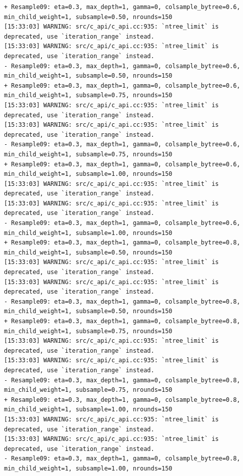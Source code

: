 \documentclass[
  letterpaper,
  DIV=11,
  numbers=noendperiod]{scrartcl}
\begin{document}
\begin{verbatim}
+ Resample09: eta=0.3, max_depth=1, gamma=0, colsample_bytree=0.6, min_child_weight=1, subsample=0.50, nrounds=150 
[15:33:03] WARNING: src/c_api/c_api.cc:935: `ntree_limit` is deprecated, use `iteration_range` instead.
[15:33:03] WARNING: src/c_api/c_api.cc:935: `ntree_limit` is deprecated, use `iteration_range` instead.
- Resample09: eta=0.3, max_depth=1, gamma=0, colsample_bytree=0.6, min_child_weight=1, subsample=0.50, nrounds=150 
+ Resample09: eta=0.3, max_depth=1, gamma=0, colsample_bytree=0.6, min_child_weight=1, subsample=0.75, nrounds=150 
[15:33:03] WARNING: src/c_api/c_api.cc:935: `ntree_limit` is deprecated, use `iteration_range` instead.
[15:33:03] WARNING: src/c_api/c_api.cc:935: `ntree_limit` is deprecated, use `iteration_range` instead.
- Resample09: eta=0.3, max_depth=1, gamma=0, colsample_bytree=0.6, min_child_weight=1, subsample=0.75, nrounds=150 
+ Resample09: eta=0.3, max_depth=1, gamma=0, colsample_bytree=0.6, min_child_weight=1, subsample=1.00, nrounds=150 
[15:33:03] WARNING: src/c_api/c_api.cc:935: `ntree_limit` is deprecated, use `iteration_range` instead.
[15:33:03] WARNING: src/c_api/c_api.cc:935: `ntree_limit` is deprecated, use `iteration_range` instead.
- Resample09: eta=0.3, max_depth=1, gamma=0, colsample_bytree=0.6, min_child_weight=1, subsample=1.00, nrounds=150 
+ Resample09: eta=0.3, max_depth=1, gamma=0, colsample_bytree=0.8, min_child_weight=1, subsample=0.50, nrounds=150 
[15:33:03] WARNING: src/c_api/c_api.cc:935: `ntree_limit` is deprecated, use `iteration_range` instead.
[15:33:03] WARNING: src/c_api/c_api.cc:935: `ntree_limit` is deprecated, use `iteration_range` instead.
- Resample09: eta=0.3, max_depth=1, gamma=0, colsample_bytree=0.8, min_child_weight=1, subsample=0.50, nrounds=150 
+ Resample09: eta=0.3, max_depth=1, gamma=0, colsample_bytree=0.8, min_child_weight=1, subsample=0.75, nrounds=150 
[15:33:03] WARNING: src/c_api/c_api.cc:935: `ntree_limit` is deprecated, use `iteration_range` instead.
[15:33:03] WARNING: src/c_api/c_api.cc:935: `ntree_limit` is deprecated, use `iteration_range` instead.
- Resample09: eta=0.3, max_depth=1, gamma=0, colsample_bytree=0.8, min_child_weight=1, subsample=0.75, nrounds=150 
+ Resample09: eta=0.3, max_depth=1, gamma=0, colsample_bytree=0.8, min_child_weight=1, subsample=1.00, nrounds=150 
[15:33:03] WARNING: src/c_api/c_api.cc:935: `ntree_limit` is deprecated, use `iteration_range` instead.
[15:33:03] WARNING: src/c_api/c_api.cc:935: `ntree_limit` is deprecated, use `iteration_range` instead.
- Resample09: eta=0.3, max_depth=1, gamma=0, colsample_bytree=0.8, min_child_weight=1, subsample=1.00, nrounds=150 

\end{verbatim}
\end{document}
